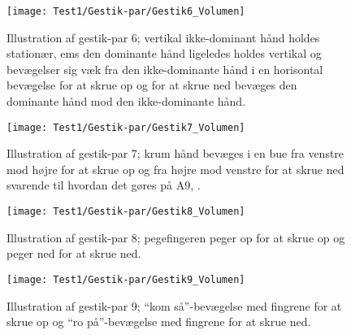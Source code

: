 \noindent
%
%
\begin{figure}[H]
	\centering
	\texttt{[image: Test1/Gestik-par/Gestik6\_Volumen]}
	\caption{Illustration af gestik-par 6; vertikal ikke-dominant hånd holdes stationær, ems den dominante hånd ligeledes holdes vertikal og bevægelser sig væk fra den ikke-dominante hånd i en horisontal bevægelse for at skrue op og for at skrue ned bevæges den dominante hånd mod den ikke-dominante hånd.}
	\label{fig:GestikPar6VolumenApp}
\end{figure}
\noindent
%
%
\begin{figure}[H]
	\centering
	\texttt{[image: Test1/Gestik-par/Gestik7\_Volumen]}
	\caption{Illustration af gestik-par 7; krum hånd bevæges i en bue fra venstre mod højre for at skrue op og fra højre mod venstre for at skrue ned svarende til hvordan det gøres på A9, \parencite{WEB:BeoplayA9}.}
	\label{fig:GestikPar7VolumenApp}
\end{figure}
\noindent
%
%
\begin{figure}[H]
	\centering
	\texttt{[image: Test1/Gestik-par/Gestik8\_Volumen]}
	\caption{Illustration af gestik-par 8; pegefingeren peger op for at skrue op og peger ned for at skrue ned.}
	\label{fig:GestikPar8VolumenApp}
\end{figure}
\noindent
%
%
\begin{figure}[H]
	\centering
	\texttt{[image: Test1/Gestik-par/Gestik9\_Volumen]}
	\caption{Illustration af gestik-par 9; \enquote{kom så}-bevægelse med fingrene for at skrue op og \enquote{ro på}-bevægelse med fingrene for at skrue ned.}
	\label{fig:GestikPar9VolumenApp}
\end{figure}
\noindent
%